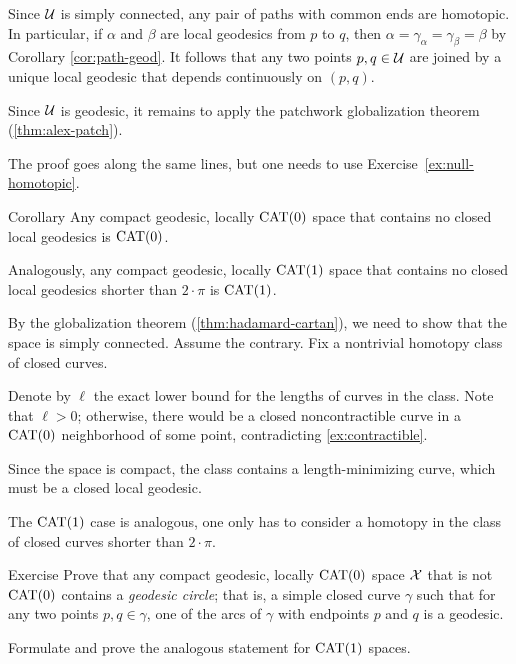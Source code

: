 Since $\mathcal{U}$ is simply connected, any pair of paths with common ends are homotopic.  In particular, if $\alpha$ and $\beta$ are local geodesics from $p$ to $q$, then $\alpha =\gamma_\alpha=\gamma_\beta=\beta$ by Corollary \ref{cor:path-geod}.
It follows that any two points $p,q\in\mathcal{U}$ are joined by a unique local geodesic that depends continuously on $(p,q)$.

Since $\mathcal{U}$ is geodesic, it remains to apply the patchwork globalization theorem (\ref{thm:alex-patch}).

The proof goes along the same lines, 
but one needs to use Exercise~\ref{ex:null-homotopic}. \qeds

\begin{thm}{Corollary}\label{cor:closed-geod-cat} 
Any compact geodesic, locally $\mathrm{CAT}(0)$ space that contains no closed local geodesics is $\mathrm{CAT}(0)$. 
 
Analogously, any compact geodesic, locally $\mathrm{CAT}(1)$ space that contains no closed local geodesics shorter than $2\cdot\pi$ is $\mathrm{CAT}(1)$.
\end{thm}

By the globalization theorem (\ref{thm:hadamard-cartan}), we need to show that the space is simply connected.
Assume the contrary. 
Fix a nontrivial homotopy class of closed curves.

Denote by $\ell$ the exact lower bound for the lengths of curves in the class.
Note that $\ell>0$;
otherwise, there would be a closed noncontractible curve in a $\mathrm{CAT}(0)$ neighborhood of some point, contradicting \ref{ex:contractible}.

Since the space is compact, the class contains a length-minimizing curve, 
which must be a closed local geodesic. 

The $\mathrm{CAT}(1)$ case is analogous, one only has to consider a homotopy in the class of closed curves shorter than $2\cdot\pi$.
\qeds

\begin{thm}{Exercise}\label{ex:geod-circle}
Prove that any compact geodesic, locally $\mathrm{CAT}(0)$ space $\mathcal{X}$ that is not $\mathrm{CAT}(0)$ contains a \emph{geodesic circle};
that is, a simple closed curve $\gamma$ such that 
for any two points $p,q\in\gamma$, one of the arcs of $\gamma$ with endpoints $p$ and $q$ is a  geodesic.

Formulate and prove the analogous statement for $\mathrm{CAT}(1)$ spaces.
\end{thm}

